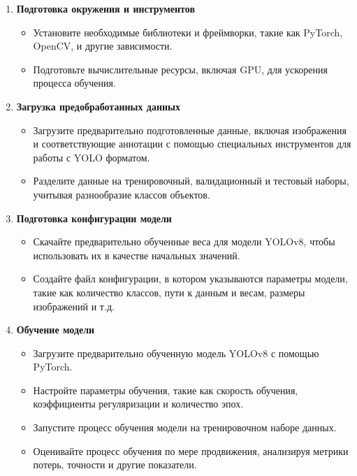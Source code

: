     \begin{enumerate}
        \item \textbf{Подготовка окружения и инструментов}
            \begin{itemize}
                \item Установите необходимые библиотеки и фреймворки, такие как PyTorch, OpenCV, и другие зависимости.
                \item Подготовьте вычислительные ресурсы, включая GPU, для ускорения процесса обучения.
            \end{itemize}
        \item \textbf{Загрузка предобработанных данных}
            \begin{itemize}
                \item Загрузите предварительно подготовленные данные, включая изображения и соответствующие аннотации с помощью специальных инструментов для работы с YOLO форматом.
                \item Разделите данные на тренировочный, валидационный и тестовый наборы, учитывая разнообразие классов объектов.
            \end{itemize}
        \item \textbf{Подготовка конфигурации модели}
            \begin{itemize}
                \item Скачайте предварительно обученные веса для модели YOLOv8, чтобы использовать их в качестве начальных значений.
                \item Создайте файл конфигурации, в котором указываются параметры модели, такие как количество классов, пути к данным и весам, размеры изображений и т.д.
            \end{itemize}
        \item \textbf{Обучение модели}
            \begin{itemize}
                \item Загрузите предварительно обученную модель YOLOv8 с помощью PyTorch.
                \item Настройте параметры обучения, такие как скорость обучения, коэффициенты регуляризации и количество эпох.
                \item Запустите процесс обучения модели на тренировочном наборе данных.
                \item Оценивайте процесс обучения по мере продвижения, анализируя метрики потерь, точности и другие показатели.
            \end{itemize}

\end{enumerate}
